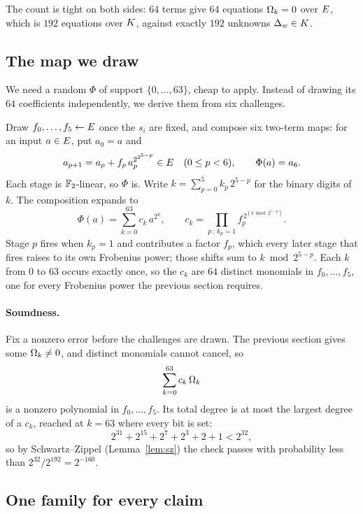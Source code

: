 The count is tight on both sides: $64$ terms give $64$ equations $\Omega_k=0$ over $E$, which is $192$ equations over $K$, against exactly $192$ unknowns $\Delta_w\in K$.

\subsection{The map we draw}\label{rs:map}

We need a random $\Phi$ of support $\{0,\dots,63\}$, cheap to apply. Instead of drawing its $64$ coefficients independently, we derive them from six challenges.

Draw $f_0,\dots,f_5\leftarrow E$ once the $s_i$ are fixed, and compose six two-term maps: for an input $a\in E$, put $a_0=a$ and
\begin{equation}
a_{p+1}=a_p+f_p\,a_p^{2^{2^{5-p}}}\in E\quad(0\le p<6),
\qquad
\Phi(a)=a_6.
\label{eq:phi}
\end{equation}
Each stage is $\mathbb{F}_2$-linear, so $\Phi$ is. Write $k=\sum_{p=0}^{5}k_p\,2^{5-p}$ for the binary digits of $k$. The composition expands to
\begin{equation}
\Phi(a)=\sum_{k=0}^{63}c_k\,a^{2^k},
\qquad
c_k=\prod_{p\,:\,k_p=1}f_p^{\,2^{(k\bmod 2^{5-p})}}.
\label{eq:ck}
\end{equation}
Stage $p$ fires when $k_p=1$ and contributes a factor $f_p$, which every later stage that fires raises to its own Frobenius power; those shifts sum to $k\bmod 2^{5-p}$. Each $k$ from $0$ to $63$ occurs exactly once, so the $c_k$ are $64$ distinct monomials in $f_0,\dots,f_5$, one for every Frobenius power the previous section requires.

\paragraph{Soundness.} Fix a nonzero error before the challenges are drawn. The previous section gives some $\Omega_k\neq0$, and distinct monomials cannot cancel, so
\[
\sum_{k=0}^{63}c_k\,\Omega_k
\]
is a nonzero polynomial in $f_0,\dots,f_5$. Its total degree is at most the largest degree of a $c_k$, reached at $k=63$ where every bit is set:
\[
2^{31}+2^{15}+2^7+2^3+2+1<2^{32},
\]
so by Schwartz--Zippel (Lemma~\ref{lem:sz}) the check passes with probability less than $2^{32}/2^{192}=2^{-160}$.

\subsection{One family for every claim}\label{rs:family}

